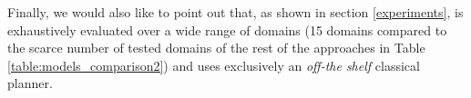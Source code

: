 Finally, we would also like to point out that, as shown in section \ref{experiments}, \FAMA is exhaustively evaluated over a wide range of domains (15 domains compared to the scarce number of tested domains of the rest of the approaches in Table \ref{table:models_comparison2}) and uses exclusively an \emph{off-the shelf} classical planner.


  































